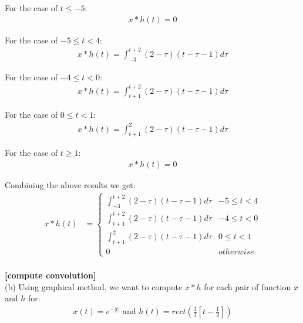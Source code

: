 \documentclass{article}
\begin{document}
For the case of $t \leq -5$:
\begin{equation*}
\begin{split}
    x * h(t) = 0
\end{split}
\end{equation*}

For the case of $-5 \leq t < 4$:
\begin{equation*}
\begin{split}
    x * h(t) = \int_{-3}^{t + 2} (2 - \tau)(t - \tau - 1)d \tau
\end{split}
\end{equation*}

For the case of $-4 \leq t < 0$:
\begin{equation*}
\begin{split}
    x * h(t) = \int_{t + 1}^{t + 2} (2 - \tau)(t - \tau - 1)d \tau
\end{split}
\end{equation*}

For the case of $0 \leq t < 1$:
\begin{equation*}
\begin{split}
    x * h(t) = \int_{t + 1}^{2} (2 - \tau)(t - \tau - 1)d \tau
\end{split}
\end{equation*}

For the case of $t \geq 1$:
\begin{equation*}
\begin{split}
    x * h(t) = 0
\end{split}
\end{equation*}

Combining the above results we get:
\begin{equation*}
\begin{split}
    x * h(t)
    &= \begin{cases}
        \int_{-3}^{t + 2} (2 - \tau)(t - \tau - 1)d \tau & -5 \leq t < 4\\
        \int_{t + 1}^{t + 2} (2 - \tau)(t - \tau - 1)d \tau & -4 \leq t < 0\\
        \int_{t + 1}^{2} (2 - \tau)(t - \tau - 1)d \tau & 0 \leq t < 1\\
        0 & otherwise
    \end{cases}\\
\end{split}
\end{equation*}


 {\bf [compute convolution]}\\
(b)
Using graphical method, we want to compute $x * h$ for each pair of function $x$ and $h$ for:
\begin{equation*}
\begin{split}
    x(t) = e^{-|t|} \text{ and } h(t) = rect(\frac{1}{3}[t - \frac{1}{2}])
\end{split}
\end{equation*}
\end{document}
